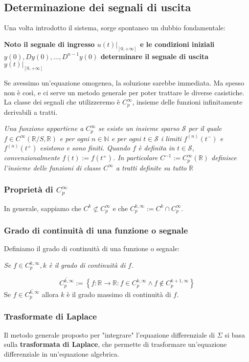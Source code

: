 \documentclass[11pt]{article}
\begin{document}
\subsection{Determinazione dei segnali di uscita}
Una volta introdotto il sistema, sorge spontaneo un dubbio fondamentale:
\begin{center}
    \textbf{Noto il segnale di ingresso $u(t)|_{[0, +\infty]}$ e le condizioni iniziali $y(0), Dy(0),...,D^{n-1}y(0)$ determinare il segnale di uscita $y(t)|_{[0, +\infty]}$}
\end{center}
Se avessimo un'equazione omogenea, la soluzione sarebbe immediata. Ma spesso non è così, e ci serve un metodo generale per poter trattare le diverse casistiche. 
La classe dei segnali che utilizzeremo è $C_p^\infty$, insieme delle funzioni infinitamente derivabili a tratti. 
\begin{center}
    \textit{Una funzione appartiene a $C_p^\infty$ se esiste un insieme sparso $\mathcal{S}$ per il quale $f \in C^\infty (\mathbb{R}/S, \mathbb{R})$ e per ogni $n \in \mathbb{N}$ e per ogni $t \in \mathcal{S}$ i limiti $f^{(n)}(t^-)$ e $f^{(n)}(t^+)$ esistono e sono finiti. Quando $f$ è definita in $t \in \mathcal{S}$, convenzionalmente $f(t) := f(t^+)$. In particolare $C^{-1} := C_p^\infty (\mathbb{R})$ definisce l'insieme delle funzioni di classe $C^\infty$ a tratti definite su tutto $\mathbb{R}$}
\end{center}
\subsubsection{Proprietà di $C_p^\infty$}
In generale, sappiamo che $C^k \not\subset C^\infty_p$ e che $C_p^{k,\infty} := C^k \cap C^\infty_p$.
\subsubsection{Grado di continuità di una funzione o segnale}
Definiamo il grado di continuità di una funzione o segnale:
\begin{center}
    \textit{Se $f \in C_p^{k,\infty}, k $ è il grado di continuità di $f$.}
\end{center}
\begin{displaymath}
    \overline{C_p^{k,\infty}} := \left\{ f:\mathbb{R} \rightarrow \mathbb{R}:f \in C_p^{k, \infty}  \wedge f \not\in C_p^{k+1,\infty}\right\}
\end{displaymath}
Se $f \in \overline{C_p^{k,\infty}}$ allora $k$ è il grado massimo di continuità di $f$.
\subsubsection{Trasformate di Laplace}
Il metodo generale proposto per "integrare" l'equazione differenziale di $\Sigma$ si basa sulla \textbf{trasformata di Laplace}, che permette di trasformare un'equazione differenziale in un'equazione algebrica.
\end{document}
